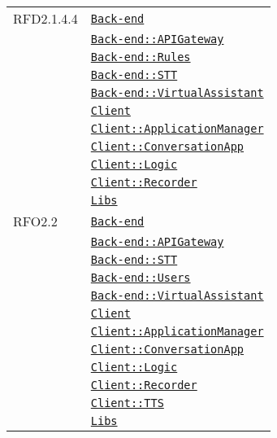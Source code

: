 \begin{longtable}{|>{\centering}m{3cm}|m{10cm}<{\centering}|}
RFD2.1.4.4 & \hyperref[Back-end]{\texttt{Back-end}}\\
& \hyperref[Back-end::APIGateway]{\texttt{Back-end::APIGateway}}\\
& \hyperref[Back-end::Rules]{\texttt{Back-end::Rules}}\\
& \hyperref[Back-end::STT]{\texttt{Back-end::STT}}\\
& \hyperref[Back-end::VirtualAssistant]{\texttt{Back-end::VirtualAssistant}}\\
& \hyperref[Client]{\texttt{Client}}\\
& \hyperref[Client::ApplicationManager]{\texttt{Client::ApplicationManager}}\\
& \hyperref[Client::ConversationApp]{\texttt{Client::ConversationApp}}\\
& \hyperref[Client::Logic]{\texttt{Client::Logic}}\\
& \hyperref[Client::Recorder]{\texttt{Client::Recorder}}\\
& \hyperref[Libs]{\texttt{Libs}}\\ \hline

RFO2.2 & \hyperref[Back-end]{\texttt{Back-end}}\\
& \hyperref[Back-end::APIGateway]{\texttt{Back-end::APIGateway}}\\
& \hyperref[Back-end::STT]{\texttt{Back-end::STT}}\\
& \hyperref[Back-end::Users]{\texttt{Back-end::Users}}\\
& \hyperref[Back-end::VirtualAssistant]{\texttt{Back-end::VirtualAssistant}}\\
& \hyperref[Client]{\texttt{Client}}\\
& \hyperref[Client::ApplicationManager]{\texttt{Client::ApplicationManager}}\\
& \hyperref[Client::ConversationApp]{\texttt{Client::ConversationApp}}\\
& \hyperref[Client::Logic]{\texttt{Client::Logic}}\\
& \hyperref[Client::Recorder]{\texttt{Client::Recorder}}\\
& \hyperref[Client::TTS]{\texttt{Client::TTS}}\\
& \hyperref[Libs]{\texttt{Libs}}\\ \hline


\end{longtable}

